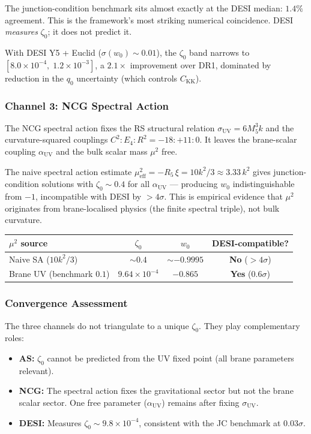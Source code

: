 \noindent
The junction-condition benchmark sits almost exactly at the DESI median: $1.4\%$ agreement. This is the framework's most striking numerical coincidence. DESI \emph{measures} $\zeta_0$; it does not predict it.

With DESI Y5 + Euclid ($\sigma(w_0) \sim 0.01$), the $\zeta_0$ band narrows to $[8.0 \times 10^{-4},\; 1.2 \times 10^{-3}]$, a $2.1\times$ improvement over DR1, dominated by reduction in the $q_0$ uncertainty (which controls $C_\mathrm{KK}$).

\subsubsection{Channel 3: NCG Spectral Action}

The NCG spectral action fixes the RS structural relation $\sigma_{\mathrm{UV}} = 6M_5^3 k$ and the curvature-squared couplings $C^2 : E_4 : R^2 = -18 : +11 : 0$. It leaves the brane-scalar coupling $\alpha_{\mathrm{UV}}$ and the bulk scalar mass $\mu^2$ free.

The naive spectral action estimate $\mu_{\mathrm{eff}}^2 = -R_5\,\xi = 10k^2/3 \approx 3.33\,k^2$ gives junction-condition solutions with $\zeta_0 \sim 0.4$ for all $\alpha_{\mathrm{UV}}$ --- producing $w_0$ indistinguishable from $-1$, incompatible with DESI by $> 4\sigma$. This is empirical evidence that $\mu^2$ originates from brane-localised physics (the finite spectral triple), not bulk curvature.

\begin{center}
\small
\begin{tabular}{l c c c}
\hline
$\mu^2$ source & $\zeta_0$ & $w_0$ & DESI-compatible? \\
\hline
Naive SA ($10k^2/3$) & $\sim 0.4$ & $\sim -0.9995$ & \textbf{No} ($>4\sigma$) \\
Brane UV (benchmark $0.1$) & $9.64 \times 10^{-4}$ & $-0.865$ & \textbf{Yes} ($0.6\sigma$) \\
\hline
\end{tabular}
\end{center}

\subsubsection{Convergence Assessment}

The three channels do not triangulate to a unique $\zeta_0$. They play complementary roles:
\begin{itemize}
  \item \textbf{AS:} $\zeta_0$ cannot be predicted from the UV fixed point (all brane parameters relevant).
  \item \textbf{NCG:} The spectral action fixes the gravitational sector but not the brane scalar sector. One free parameter ($\alpha_{\mathrm{UV}}$) remains after fixing $\sigma_{\mathrm{UV}}$.
  \item \textbf{DESI:} Measures $\zeta_0 \sim 9.8 \times 10^{-4}$, consistent with the JC benchmark at $0.03\sigma$.
\end{itemize}

